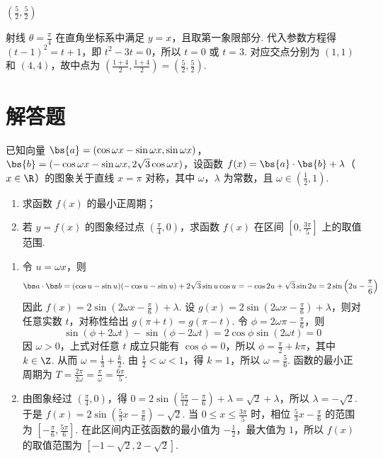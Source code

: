 \begin{answer}
\(\left(\frac{5}{2},\frac{5}{2}\right)\)
\end{answer}

\begin{solution}
射线 \(\theta=\frac\pi4\) 在直角坐标系中满足 \(y=x\)，且取第一象限部分. 代入参数方程得 \((t-1)^2=t+1\)，即 \(t^2-3t=0\)，所以 \(t=0\) 或 \(t=3\). 对应交点分别为 \((1,1)\) 和 \((4,4)\)，故中点为 \(\left(\frac{1+4}{2},\frac{1+4}{2}\right)=\left(\frac52,\frac52\right)\).
\end{solution}

\section{解答题}

\begin{problem}
已知向量 \( \bs{a} = (\cos \omega x - \sin \omega x, \sin \omega x) \)，\( \bs{b} = (-\cos \omega x - \sin \omega x, 2\sqrt{3} \cos \omega x) \)，设函数 \( f(x) = \bs{a} \cdot \bs{b} + \lambda \)（\(x \in \R\)）的图象关于直线 \(x = \pi\) 对称，其中 \(\omega\)，\(\lambda\) 为常数，且 \(\omega \in \left(\frac{1}{2}, 1\right)\).

\begin{enumerate}
\item 求函数 \( f(x) \) 的最小正周期；
\item 若 \( y = f(x) \) 的图象经过点 \( \left(\frac{\pi}{4}, 0\right)\)，求函数 \( f(x) \) 在区间 \( \left[0, \frac{3\pi}{5}\right] \) 上的取值范围.
\end{enumerate}
\end{problem}

\begin{solution}
\begin{enumerate}
\item 令 \(u=\omega x\)，则
\[
\bs a\cdot\bs b=(\cos u-\sin u)(-\cos u-\sin u)+2\sqrt3\sin u\cos u=-\cos2u+\sqrt3\sin2u=2\sin\left(2u-\frac\pi6\right)
\]
因此 \(f(x)=2\sin\left(2\omega x-\frac\pi6\right)+\lambda\). 设 \(g(x)=2\sin\left(2\omega x-\frac\pi6\right)+\lambda\)，则对任意实数 \(t\)，对称性给出 \(g(\pi+t)=g(\pi-t)\). 令 \(\phi=2\omega\pi-\frac\pi6\)，则
\[
\sin(\phi+2\omega t)-\sin(\phi-2\omega t)=2\cos\phi\sin(2\omega t)=0
\]
因 \(\omega>0\)，上式对任意 \(t\) 成立只能有 \(\cos\phi=0\)，所以 \(\phi=\frac\pi2+k\pi\)，其中 \(k\in\Z\). 从而 \(\omega=\frac13+\frac{k}{2}\). 由 \(\frac12<\omega<1\)，得 \(k=1\)，所以 \(\omega=\frac56\). 函数的最小正周期为 \(T=\frac{2\pi}{2\omega}=\frac\pi\omega=\frac{6\pi}{5}\).
\item 由图象经过 \(\left(\frac\pi4,0\right)\)，得 \(0=2\sin\left(\frac{5\pi}{12}-\frac\pi6\right)+\lambda=\sqrt2+\lambda\)，所以 \(\lambda=-\sqrt2\). 于是 \(f(x)=2\sin\left(\frac53x-\frac\pi6\right)-\sqrt2\). 当 \(0\leqslant x\leqslant\frac{3\pi}{5}\) 时，相位 \(\frac53x-\frac\pi6\) 的范围为 \(\left[-\frac\pi6,\frac{5\pi}{6}\right]\). 在此区间内正弦函数的最小值为 \(-\frac12\)，最大值为 \(1\)，所以 \(f(x)\) 的取值范围为 \(\left[-1-\sqrt2,2-\sqrt2\right]\).
\end{enumerate}
\end{solution}

